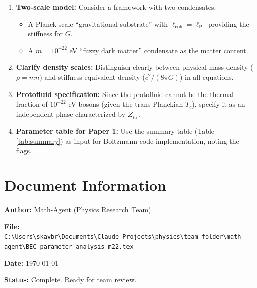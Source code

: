 \documentclass[11pt,a4paper]{article}
\newcommand{\lPl}{\ensuremath{\ell_{\mathrm{Pl}}}}
\begin{document}
\begin{enumerate}
    \item \textbf{Two-scale model:} Consider a framework with two condensates:
    \begin{itemize}
        \item A Planck-scale ``gravitational substrate'' with $\ell_{\mathrm{coh}} = \lPl$ providing the stiffness for $G$.
        \item A $m = 10^{-22}$ eV ``fuzzy dark matter'' condensate as the matter content.
    \end{itemize}

    \item \textbf{Clarify density scales:} Distinguish clearly between physical mass density ($\rho = mn$) and stiffness-equivalent density ($c^2/(8\pi G)$) in all equations.

    \item \textbf{Protofluid specification:} Since the protofluid cannot be the thermal fraction of $10^{-22}$ eV bosons (given the trans-Planckian $T_c$), specify it as an independent phase characterized by $Z_{pf}$.

    \item \textbf{Parameter table for Paper 1:} Use the summary table (Table \ref{tab:summary}) as input for Boltzmann code implementation, noting the flags.
\end{enumerate}

\section*{Document Information}

\textbf{Author:} Math-Agent (Physics Research Team)

\textbf{File:} \texttt{C:\textbackslash Users\textbackslash skavbr\textbackslash Documents\textbackslash Claude\_Projects\textbackslash physics\textbackslash team\_folder\textbackslash math-agent\textbackslash BEC\_parameter\_analysis\_m22.tex}

\textbf{Date:} \today

\textbf{Status:} Complete. Ready for team review.
\end{document}
